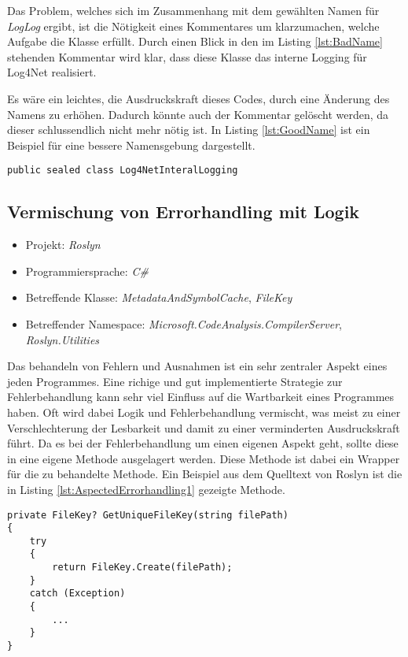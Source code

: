 \SuperPar Das Problem, welches sich im Zusammenhang mit dem gewählten Namen für \textit{LogLog} ergibt, ist die Nötigkeit eines Kommentares um klarzumachen, welche  Aufgabe die Klasse erfüllt. Durch einen Blick in den im Listing \ref{lst:BadName} stehenden Kommentar wird klar, dass diese Klasse das interne Logging für Log4Net realisiert. 

Es wäre ein leichtes, die Ausdruckskraft dieses Codes, durch eine Änderung des Namens zu erhöhen. Dadurch könnte auch der Kommentar gelöscht werden, da dieser schlussendlich nicht mehr nötig ist. In Listing \ref{lst:GoodName} ist ein Beispiel für eine bessere Namensgebung dargestellt.

\begin{lstlisting}[language={[Sharp]C}, caption=Beispiele für bessere Namensgebung, label=lst:GoodName]
	public sealed class Log4NetInteralLogging
\end{lstlisting}

\subsection{Vermischung von Errorhandling mit Logik}
\begin{itemize}
	\item Projekt: \textit{Roslyn}
	\item Programmiersprache: \textit{C\#}
	\item Betreffende Klasse: \textit{MetadataAndSymbolCache}, \textit{FileKey}
	\item Betreffender Namespace: \textit{Microsoft.CodeAnalysis.CompilerServer}, \textit{Roslyn.Utilities}
\end{itemize}

\SuperPar Das behandeln von Fehlern und Ausnahmen ist ein sehr zentraler Aspekt eines jeden Programmes. Eine richige und gut implementierte Strategie zur Fehlerbehandlung kann sehr viel Einfluss auf die Wartbarkeit eines Programmes haben. Oft wird dabei Logik und Fehlerbehandlung vermischt, was meist zu einer Verschlechterung der Lesbarkeit und damit zu einer verminderten Ausdruckskraft führt. Da es bei der Fehlerbehandlung um einen eigenen Aspekt geht, sollte diese in eine eigene Methode ausgelagert werden. Diese Methode ist dabei ein Wrapper für die zu behandelte Methode. Ein Beispiel aus dem Quelltext von Roslyn ist die in Listing \ref{lst:AspectedErrorhandling1} gezeigte Methode.

\begin{lstlisting}[language={[Sharp]C}, caption=Beispiele für getrennten Aspket der Fehlerbehandlung, label=lst:AspectedErrorhandling1]
private FileKey? GetUniqueFileKey(string filePath)
{
	try
	{
		return FileKey.Create(filePath);
	}
	catch (Exception)
	{
		...
	}
}
\end{lstlisting}

